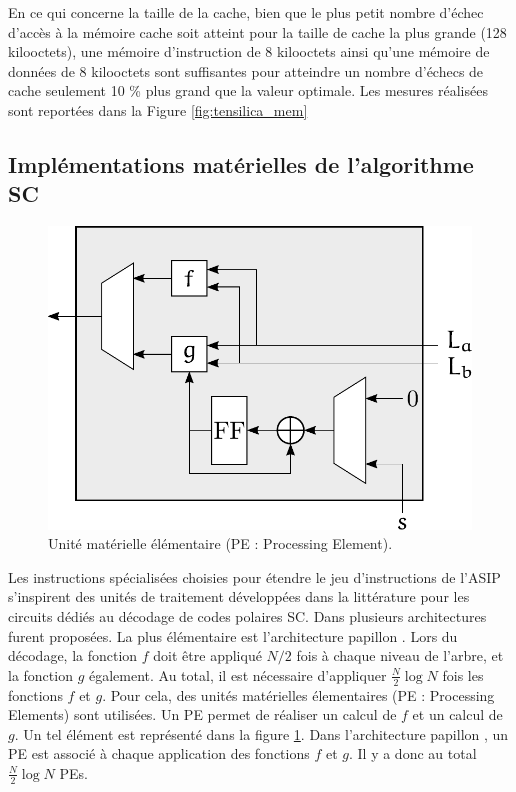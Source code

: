 En ce qui concerne la taille de la cache, bien que le plus petit nombre d'échec d'accès à la mémoire cache soit atteint pour la taille de cache la plus grande (128 kilooctets), une mémoire d'instruction de 8 kilooctets ainsi qu'une mémoire de données de 8 kilooctets sont suffisantes pour atteindre un nombre d'échecs de cache seulement 10 \% plus grand que la valeur optimale. Les mesures réalisées sont reportées dans la Figure \ref{fig:tensilica_mem}

\subsection{Implémentations matérielles de l'algorithme SC}

\begin{figure}
\centering
\includegraphics[scale=0.75]{main/ch3_fig/PE}
\caption{Unité matérielle élémentaire (PE : Processing Element).}
\label{fig:pe}
\end{figure}

Les instructions spécialisées choisies pour étendre le jeu d'instructions de l'ASIP s'inspirent des unités de traitement développées dans la littérature pour les circuits dédiés au décodage de codes polaires SC. Dans \cite{leroux_hardware_2011} plusieurs architectures furent proposées. La plus élémentaire est l'architecture \og papillon \fg. Lors du décodage, la fonction $f$ doit être appliqué $N/2$ fois à chaque niveau de l'arbre, et la fonction $g$ également. Au total, il est nécessaire d'appliquer $\frac{N}{2} \log N$ fois les fonctions $f$ et $g$. Pour cela, des unités matérielles élementaires (PE : Processing Elements) sont utilisées. Un PE permet de réaliser un calcul de $f$ et un calcul de $g$. Un tel élément est représenté dans la figure \ref{fig:pe}. Dans l'architecture \og papillon \fg, un PE est associé à chaque application des fonctions $f$ et $g$. Il y a donc au total $\frac{N}{2} \log N$ PEs.

